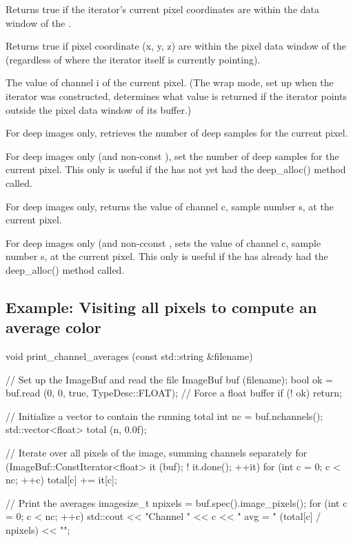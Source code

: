 Returns {\cf true} if the iterator's current pixel coordinates 
are within the data window of the \ImageBuf.
\apiend

Returns {\cf true} if pixel coordinate ({\cf x, y, z}) are within the
pixel data window of the \ImageBuf (regardless of where the iterator itself
is currently pointing).
\apiend

The value of channel {\cf i} of the current pixel.  (The wrap
mode, set up when the iterator was constructed, determines what value
is returned if the iterator points outside the pixel data window of
its buffer.)
\apiend

For deep images only, retrieves the number of deep samples for the
current pixel.
\apiend

For deep images only (and non-const \ImageBuf), set the number of deep
samples for the current pixel. This only is useful if the \ImageBuf has
not yet had the {\cf deep_alloc()} method called.
\apiend

For deep images only, returns the value of channel {\cf c}, sample
number {\cf s}, at the current pixel.
\apiend

For deep images only (and non-cconst \ImageBuf, sets the value of channel
{\cf c}, sample number {\cf s}, at the current pixel. This only is useful
if the \ImageBuf has already had the {\cf deep_alloc()} method called.
\apiend

\subsection*{Example: Visiting all pixels to compute an average color}

\begin{code}
void print_channel_averages (const std::string &filename)
{
    // Set up the ImageBuf and read the file
    ImageBuf buf (filename);
    bool ok = buf.read (0, 0, true, TypeDesc::FLOAT);  // Force a float buffer
    if (! ok)
        return;

    // Initialize a vector to contain the running total
    int nc = buf.nchannels();
    std::vector<float> total (n, 0.0f);

    // Iterate over all pixels of the image, summing channels separately
    for (ImageBuf::ConstIterator<float> it (buf);  ! it.done();  ++it)
        for (int c = 0;  c < nc;  ++c)
            total[c] += it[c];

    // Print the averages
    imagesize_t npixels = buf.spec().image_pixels();
    for (int c = 0;  c < nc;  ++c)
        std::cout << "Channel " << c << " avg = " (total[c] / npixels) << "\n";
}
\end{code}


